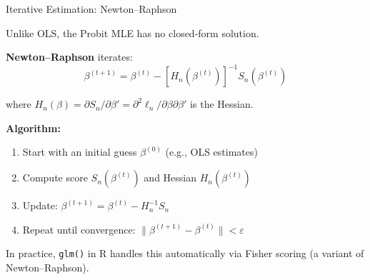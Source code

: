 \documentclass[aspectratio=169, handout, t]{beamer}
\numberwithin{equation}{section}
\begin{document}

\begin{frame}{Iterative Estimation: Newton--Raphson}

Unlike OLS, the Probit MLE has no closed-form solution.

\pause

\textbf{Newton--Raphson} iterates:
\[
\beta^{(t+1)} = \beta^{(t)} - \left[H_n(\beta^{(t)})\right]^{-1} S_n(\beta^{(t)})
\]

where $H_n(\beta) = \partial S_n / \partial \beta' = \partial^2 \ell_n / \partial \beta \partial \beta'$ is the Hessian.

\pause

\bigskip

\textbf{Algorithm:}
\begin{enumerate}
    \item Start with an initial guess $\beta^{(0)}$ (e.g., OLS estimates)
    \item Compute score $S_n(\beta^{(t)})$ and Hessian $H_n(\beta^{(t)})$
    \item Update: $\beta^{(t+1)} = \beta^{(t)} - H_n^{-1} S_n$
    \item Repeat until convergence: $\|\beta^{(t+1)} - \beta^{(t)}\| < \varepsilon$
\end{enumerate}

\pause

In practice, \texttt{glm()} in R handles this automatically via Fisher scoring (a variant of Newton--Raphson).

\end{frame}

\end{document}
